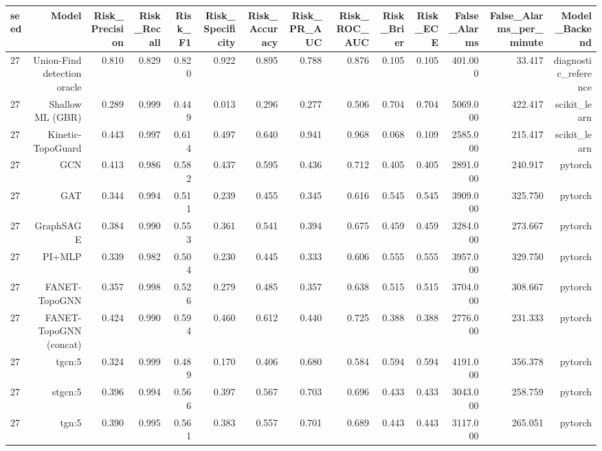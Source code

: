 \begin{tabular}{lrrrrrrrrrrrrr}
\toprule
seed & Model & Risk\_Precision & Risk\_Recall & Risk\_F1 & Risk\_Specificity & Risk\_Accuracy & Risk\_PR\_AUC & Risk\_ROC\_AUC & Risk\_Brier & Risk\_ECE & False\_Alarms & False\_Alarms\_per\_minute & Model\_Backend \\
\midrule
27 & Union-Find detection oracle & 0.810 & 0.829 & 0.820 & 0.922 & 0.895 & 0.788 & 0.876 & 0.105 & 0.105 & 401.000 & 33.417 & diagnostic\_reference \\
27 & Shallow ML (GBR) & 0.289 & 0.999 & 0.449 & 0.013 & 0.296 & 0.277 & 0.506 & 0.704 & 0.704 & 5069.000 & 422.417 & scikit\_learn \\
27 & Kinetic-TopoGuard & 0.443 & 0.997 & 0.614 & 0.497 & 0.640 & 0.941 & 0.968 & 0.068 & 0.109 & 2585.000 & 215.417 & scikit\_learn \\
27 & GCN & 0.413 & 0.986 & 0.582 & 0.437 & 0.595 & 0.436 & 0.712 & 0.405 & 0.405 & 2891.000 & 240.917 & pytorch \\
27 & GAT & 0.344 & 0.994 & 0.511 & 0.239 & 0.455 & 0.345 & 0.616 & 0.545 & 0.545 & 3909.000 & 325.750 & pytorch \\
27 & GraphSAGE & 0.384 & 0.990 & 0.553 & 0.361 & 0.541 & 0.394 & 0.675 & 0.459 & 0.459 & 3284.000 & 273.667 & pytorch \\
27 & PI+MLP & 0.339 & 0.982 & 0.504 & 0.230 & 0.445 & 0.333 & 0.606 & 0.555 & 0.555 & 3957.000 & 329.750 & pytorch \\
27 & FANET-TopoGNN & 0.357 & 0.998 & 0.526 & 0.279 & 0.485 & 0.357 & 0.638 & 0.515 & 0.515 & 3704.000 & 308.667 & pytorch \\
27 & FANET-TopoGNN (concat) & 0.424 & 0.990 & 0.594 & 0.460 & 0.612 & 0.440 & 0.725 & 0.388 & 0.388 & 2776.000 & 231.333 & pytorch \\
27 & tgcn:5 & 0.324 & 0.999 & 0.489 & 0.170 & 0.406 & 0.680 & 0.584 & 0.594 & 0.594 & 4191.000 & 356.378 & pytorch \\
27 & stgcn:5 & 0.396 & 0.994 & 0.566 & 0.397 & 0.567 & 0.703 & 0.696 & 0.433 & 0.433 & 3043.000 & 258.759 & pytorch \\
27 & tgn:5 & 0.390 & 0.995 & 0.561 & 0.383 & 0.557 & 0.701 & 0.689 & 0.443 & 0.443 & 3117.000 & 265.051 & pytorch \\
\bottomrule
\end{tabular}